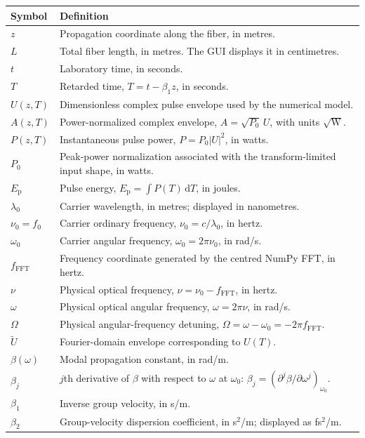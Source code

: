 \documentclass[11pt,a4paper]{article}
\newcommand{\FFT}{\mathrm{FFT}}
\newcommand{\dd}{\mathrm{d}}
\begin{document}
\begin{longtable}{p{}p{}}
\toprule
\textbf{Symbol} & \textbf{Definition}\\
\midrule
$z$ & Propagation coordinate along the fiber, in metres.\\
$L$ & Total fiber length, in metres. The GUI displays it in centimetres.\\
$t$ & Laboratory time, in seconds.\\
$T$ & Retarded time, $T=t-\beta_1 z$, in seconds.\\
$U(z,T)$ & Dimensionless complex pulse envelope used by the numerical model.\\
$A(z,T)$ & Power-normalized complex envelope, $A=\sqrt{P_0}\,U$, with units
$\sqrt{\mathrm{W}}$.\\
$P(z,T)$ & Instantaneous pulse power, $P=P_0|U|^2$, in watts.\\
$P_0$ & Peak-power normalization associated with the transform-limited input
shape, in watts.\\
$E_{\mathrm{p}}$ & Pulse energy, $E_{\mathrm{p}}=\int P(T)\,\dd T$, in joules.\\
$\lambda_0$ & Carrier wavelength, in metres; displayed in nanometres.\\
$\nu_0=f_0$ & Carrier ordinary frequency, $\nu_0=c/\lambda_0$, in hertz.\\
$\omega_0$ & Carrier angular frequency, $\omega_0=2\pi\nu_0$, in rad/s.\\
$f_{\FFT}$ & Frequency coordinate generated by the centred NumPy FFT, in hertz.\\
$\nu$ & Physical optical frequency, $\nu=\nu_0-f_{\FFT}$, in hertz.\\
$\omega$ & Physical optical angular frequency, $\omega=2\pi\nu$, in rad/s.\\
$\Omega$ & Physical angular-frequency detuning, $\Omega=\omega-\omega_0=-2\pi f_{\FFT}$.\\
$\widetilde U$ & Fourier-domain envelope corresponding to $U(T)$.\\
$\beta(\omega)$ & Modal propagation constant, in rad/m.\\
$\beta_j$ & $j$th derivative of $\beta$ with respect to $\omega$ at $\omega_0$:
$\beta_j=(\partial^j\beta/\partial\omega^j)_{\omega_0}$.\\
$\beta_1$ & Inverse group velocity, in s/m.\\
$\beta_2$ & Group-velocity dispersion coefficient, in s$^2$/m; displayed as fs$^2$/m.\\

\end{longtable}
\end{document}
